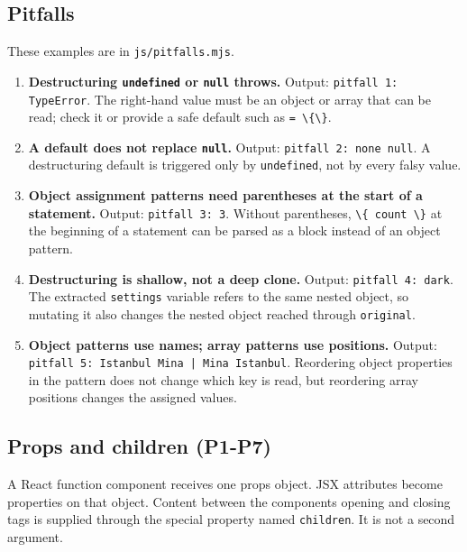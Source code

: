 \documentclass[
]{article}
\newcommand{\passthrough}[1]{#1}
\providecommand{\tightlist}{%
  \setlength{\itemsep}{0pt}\setlength{\parskip}{0pt}}
\begin{document}
\subsection{Pitfalls}\label{pitfalls}

These examples are in \passthrough{\lstinline!js/pitfalls.mjs!}.

\begin{enumerate}
\def\labelenumi{\arabic{enumi}.}
\tightlist
\item
  \textbf{Destructuring \passthrough{\lstinline!undefined!} or
  \passthrough{\lstinline!null!} throws.} Output:
  \passthrough{\lstinline!pitfall 1: TypeError!}. The right-hand value
  must be an object or array that can be read; check it or provide a
  safe default such as \passthrough{\lstinline!= \{\}!}.
\item
  \textbf{A default does not replace \passthrough{\lstinline!null!}.}
  Output: \passthrough{\lstinline!pitfall 2: none null!}. A
  destructuring default is triggered only by
  \passthrough{\lstinline!undefined!}, not by every falsy value.
\item
  \textbf{Object assignment patterns need parentheses at the start of a
  statement.} Output: \passthrough{\lstinline!pitfall 3: 3!}. Without
  parentheses, \passthrough{\lstinline!\{ count \}!} at the beginning of
  a statement can be parsed as a block instead of an object pattern.
\item
  \textbf{Destructuring is shallow, not a deep clone.} Output:
  \passthrough{\lstinline!pitfall 4: dark!}. The extracted
  \passthrough{\lstinline!settings!} variable refers to the same nested
  object, so mutating it also changes the nested object reached through
  \passthrough{\lstinline!original!}.
\item
  \textbf{Object patterns use names; array patterns use positions.}
  Output:
  \passthrough{\lstinline!pitfall 5: Istanbul Mina | Mina Istanbul!}.
  Reordering object properties in the pattern does not change which key
  is read, but reordering array positions changes the assigned values.
\end{enumerate}

\subsection{Props and children (P1-P7)}\label{props-and-children-p1-p7}

A React function component receives one props object. JSX attributes
become properties on that object. Content between the
component\textquotesingle s opening and closing tags is supplied through
the special property named \passthrough{\lstinline!children!}. It is not
a second argument.
\end{document}
